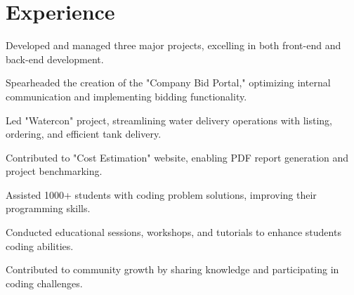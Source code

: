 \documentclass[]{deedy-resume-openfont}
\begin{document}
\hfill
\begin{minipage}[t]{0.66\textwidth} 


\section{Experience}


\vspace{\topsep} %
\begin{tightemize}
\item Developed and managed three major projects, excelling in both front-end and back-end development.
\item Spearheaded the creation of the "Company Bid Portal," optimizing internal communication and implementing bidding functionality. 
\item Led "Watercon" project, streamlining water delivery operations with listing, ordering, and efficient tank delivery.
\item Contributed to "Cost Estimation" website, enabling PDF report generation and project benchmarking.
\end{tightemize}
\sectionsep

\begin{tightemize}
\item Assisted 1000+ students with coding problem solutions, improving their programming skills.
\item Conducted educational sessions, workshops, and tutorials to enhance students coding abilities.
\item Contributed to  community growth by sharing knowledge and participating in coding challenges. 

\end{tightemize}
\sectionsep



\end{minipage}
\end{document}
